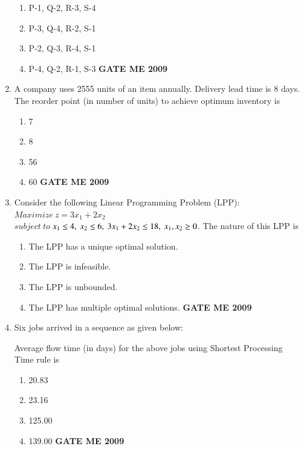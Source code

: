 \documentclass[journal]{IEEEtran}
\begin{document}
\begin{enumerate}[leftmargin=0pt]
\begin{enumerate}[label=(\Alph*)]
  \item P-1, Q-2, R-3, S-4
  \item P-3, Q-4, R-2, S-1
  \item P-2, Q-3, R-4, S-1
  \item P-4, Q-2, R-1, S-3
\hfill{\textbf{GATE ME 2009}}
\end{enumerate}

\item A company uses 2555 units of an item annually. Delivery lead time is 8 days. The reorder point (in number of units) to achieve optimum inventory is
\begin{enumerate}[label=(\Alph*)]
  \item 7
  \item 8
  \item 56
  \item 60
\hfill{\textbf{GATE ME 2009}}
\end{enumerate}

\item Consider the following Linear Programming Problem (LPP): \\      $Maximize \ z = 3x_1 + 2x_2$ \\$subject\  to\   $$x_1 \leq 4,\\\ x_2 \leq 6,\\\ 3x_1 + 2x_2 \leq 18,\\\ x_1, x_2 \geq 0$. The nature of this LPP is
\begin{enumerate}[label=(\Alph*)]
  \item The LPP has a unique optimal solution.
  \item The LPP is infeasible.
  \item The LPP is unbounded.
  \item The LPP has multiple optimal solutions.
\hfill{\textbf{GATE ME 2009}}
\end{enumerate}

\item Six jobs arrived in a sequence as given below:\\
\begin{table}[h]
    \centering
    
\end{table}

Average flow time (in days) for the above jobs using Shortest Processing Time rule is
\begin{enumerate}[label=(\Alph*)]
  \item 20.83
  \item 23.16
  \item 125.00
  \item 139.00
\hfill{\textbf{GATE ME 2009}}
\end{enumerate}


\end{enumerate}
\end{document}
